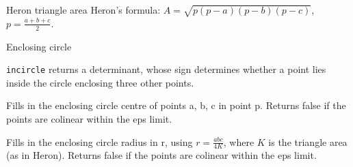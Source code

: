 \begin{algorithm}{Heron triangle area}
\desc
Heron's formula: $A=\sqrt{p(p-a)(p-b)(p-c)}$, $p=\frac{a+b+c}{2}$.
\end{algorithm}



\begin{algorithm}{Enclosing circle}

\desc
{\tt incircle} returns a determinant, whose sign determines whether a point
lies inside the circle enclosing three other points.


\desc
Fills in the enclosing circle centre of points a, b, c in point p.
Returns false if the points are colinear within the eps limit.

\desc
Fills in the enclosing circle radius in r, using $r=\frac{abc}{4K}$,
where $K$ is the triangle area (as in Heron).
Returns false if the points are colinear within the eps limit.
\end{algorithm}

